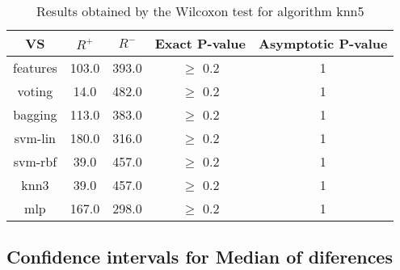 \documentclass[a4paper,10pt]{article}
\begin{document}
\begin{table}[!htp]
\centering\small
\begin{tabular}{
|c|c|c|c|c|}
\hline
 VS & $R^{+}$ & $R^{-}$ & Exact P-value & Asymptotic P-value \\ \hline 
features & 103.0 & 393.0 & $\geq$ 0.2 & 1\\ \hline 
voting & 14.0 & 482.0 & $\geq$ 0.2 & 1\\ \hline 
bagging & 113.0 & 383.0 & $\geq$ 0.2 & 1\\ \hline 
svm-lin & 180.0 & 316.0 & $\geq$ 0.2 & 1\\ \hline 
svm-rbf & 39.0 & 457.0 & $\geq$ 0.2 & 1\\ \hline 
knn3 & 39.0 & 457.0 & $\geq$ 0.2 & 1\\ \hline 
mlp & 167.0 & 298.0 & $\geq$ 0.2 & 1\\ \hline 

\end{tabular}
\caption{Results obtained by the Wilcoxon test for algorithm knn5}
\end{table}

\subsection{Confidence intervals for Median of diferences}
\end{document}
